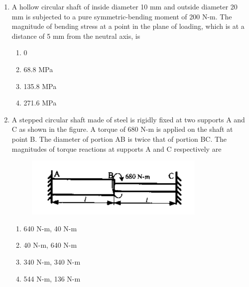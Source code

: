 \documentclass[a4paper,10pt]{article}
\begin{document}
\begin{enumerate}
\begin{multicols}{4}
\begin{enumerate}
\item 55.2 N
\item 62.5 N
\item 74.3 N
\item 86.2 N
\end{enumerate}
\end{multicols}

\item A hollow circular shaft of inside diameter 10 mm and outside diameter 20 mm is subjected to a pure symmetric-bending moment of 200 N-m. The magnitude of bending stress at a point in the plane of loading, which is at a distance of 5 mm from the neutral axis, is
\hfill{}

\begin{multicols}{4}
\begin{enumerate}
\item 0
\item 68.8 MPa
\item 135.8 MPa
\item 271.6 MPa
\end{enumerate}
\end{multicols}

\item A stepped circular shaft made of steel is rigidly fixed at two supports A and C as shown in the figure. A torque of 680 N-m is applied on the shaft at point B. The diameter of portion AB is twice that of portion BC. The magnitudes of torque reactions at supports A and C respectively are
\begin{figure}[H]
    \centering
    \includegraphics[width=0.6\columnwidth]{Dq12.png}
    \caption*{}
    \label{fig:q12_solid}
\end{figure}
\hfill{}

\begin{multicols}{2}
\begin{enumerate}
\item 640 N-m, 40 N-m
\item 40 N-m, 640 N-m
\item 340 N-m, 340 N-m
\item 544 N-m, 136 N-m
\end{enumerate}
\end{multicols}


\end{enumerate}
\end{document}
